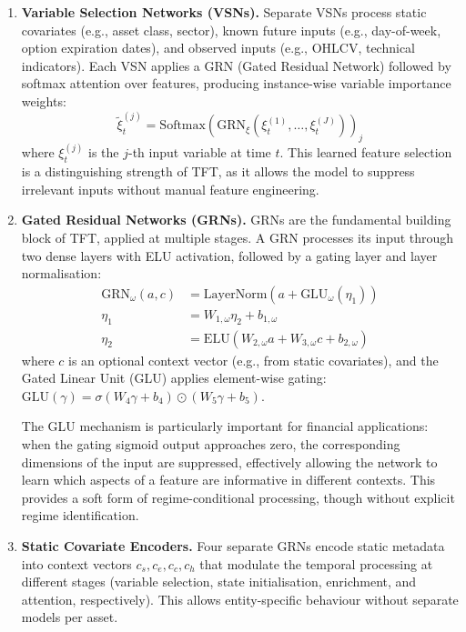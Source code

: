 \documentclass[conference]{IEEEtran}
\begin{document}
\begin{enumerate}[nosep]
    \item \textbf{Variable Selection Networks (VSNs).} Separate VSNs process static covariates (e.g., asset class, sector), known future inputs (e.g., day-of-week, option expiration dates), and observed inputs (e.g., OHLCV, technical indicators). Each VSN applies a GRN (Gated Residual Network) followed by softmax attention over features, producing instance-wise variable importance weights:
    \begin{equation}
    \tilde{\xi}_t^{(j)} = \text{Softmax}\!\left(\text{GRN}_\xi(\xi_t^{(1)}, \ldots, \xi_t^{(J)})\right)_j
    \end{equation}
    where $\xi_t^{(j)}$ is the $j$-th input variable at time $t$. This learned feature selection is a distinguishing strength of TFT, as it allows the model to suppress irrelevant inputs without manual feature engineering.

    \item \textbf{Gated Residual Networks (GRNs).} GRNs are the fundamental building block of TFT, applied at multiple stages. A GRN processes its input through two dense layers with ELU activation, followed by a gating layer and layer normalisation:
    \begin{align}
    \text{GRN}_\omega(a, c) &= \text{LayerNorm}(a + \text{GLU}_\omega(\eta_1)) \\
    \eta_1 &= W_{1,\omega} \eta_2 + b_{1,\omega} \\
    \eta_2 &= \text{ELU}(W_{2,\omega} a + W_{3,\omega} c + b_{2,\omega})
    \end{align}
    where $c$ is an optional context vector (e.g., from static covariates), and the Gated Linear Unit (GLU) applies element-wise gating: $\text{GLU}(\gamma) = \sigma(W_4 \gamma + b_4) \odot (W_5 \gamma + b_5)$.

    The GLU mechanism is particularly important for financial applications: when the gating sigmoid output approaches zero, the corresponding dimensions of the input are suppressed, effectively allowing the network to learn which aspects of a feature are informative in different contexts. This provides a soft form of regime-conditional processing, though without explicit regime identification.

    \item \textbf{Static Covariate Encoders.} Four separate GRNs encode static metadata into context vectors $c_s, c_e, c_c, c_h$ that modulate the temporal processing at different stages (variable selection, state initialisation, enrichment, and attention, respectively). This allows entity-specific behaviour without separate models per asset.


\end{enumerate}
\end{document}

